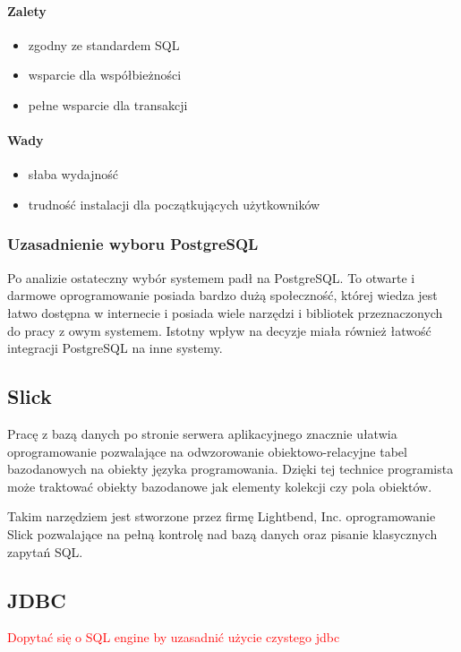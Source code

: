 \documentclass[a4paper,12pt,twoside]{article}
\begin{document}
\paragraph{Zalety}
\begin{itemize}
\item{zgodny ze standardem SQL}
\item{wsparcie dla współbieżności}
\item{pełne wsparcie dla transakcji}
\end{itemize}
\paragraph{Wady}
\begin{itemize}
\item{słaba wydajność}
\item{trudność instalacji dla początkujących użytkowników}
\end{itemize}

\subsubsection{Uzasadnienie wyboru PostgreSQL}
Po analizie ostateczny wybór systemem padł na PostgreSQL.
To otwarte i darmowe oprogramowanie posiada bardzo dużą społeczność, której wiedza jest łatwo dostępna w internecie 
i posiada wiele narzędzi i bibliotek przeznaczonych do pracy z owym systemem. 
Istotny wpływ na decyzje miała również łatwość integracji PostgreSQL na inne systemy.  

\subsection{Slick}  
Pracę z bazą danych po stronie serwera aplikacyjnego 
znacznie ułatwia oprogramowanie pozwalające na odwzorowanie obiektowo-relacyjne tabel bazodanowych na obiekty języka programowania.
Dzięki tej technice programista może traktować obiekty bazodanowe jak elementy kolekcji czy pola obiektów.

Takim narzędziem jest stworzone przez firmę Lightbend, Inc. 
oprogramowanie Slick\cite{slick} pozwalające na pełną kontrolę nad bazą danych oraz pisanie klasycznych zapytań SQL.

\subsection{JDBC}  
\textcolor{red}{Dopytać się o SQL engine by uzasadnić użycie czystego jdbc}
\end{document}
